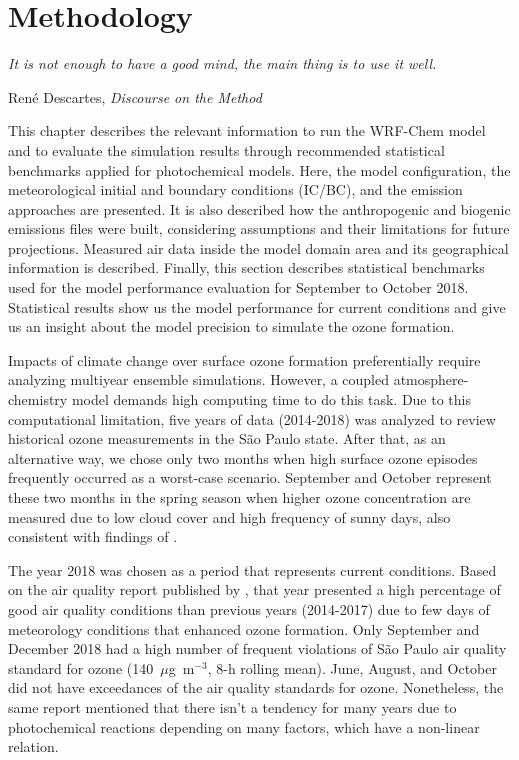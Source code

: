 \chapter{\bf Methodology}\label{chap:metho}
\epigraph{\textit{It is not enough to have a good mind, the main thing is to use it well.}}{René Descartes, \textit{Discourse on the Method}}

\noindent This chapter describes the relevant information to run the WRF-Chem model and to evaluate the simulation results through recommended statistical benchmarks applied for photochemical models. 
Here, the model configuration, the meteorological initial and boundary conditions (IC/BC), and the emission approaches are presented.
It is also described how the anthropogenic and biogenic emissions files were built, considering assumptions and their limitations for future projections.
Measured air data inside the model domain area and its geographical information is described.
Finally, this section describes statistical benchmarks used for the model performance evaluation for September to October 2018.
Statistical results show us the model performance for current conditions and give us an insight about the model precision to simulate the ozone formation.

Impacts of climate change over surface ozone formation preferentially require analyzing multiyear ensemble simulations.
However, a coupled atmosphere-chemistry model demands high computing time to do this task.
Due to this computational limitation, five years of data (2014-2018) was analyzed to review historical ozone measurements in the S\~{a}o Paulo state. 
After that, as an alternative way, we chose only two months when high surface ozone episodes frequently occurred as a worst-case scenario.
September and October represent these two months in the spring season when higher ozone concentration are measured due to low cloud cover and high frequency of sunny days, also consistent with findings of \citet{Carvalho2015}.

The year 2018 was chosen as a period that represents current conditions.
Based on the air quality report published by \citet{CETESB2019}, that year presented a high percentage of good air quality conditions than previous years (2014-2017) due to few days of meteorology conditions that enhanced ozone formation.
Only September and December 2018 had a high number of frequent violations of S\~{a}o Paulo air quality standard for ozone (140~$\mu$g~m$^{-3}$, 8-h rolling mean).
June, August, and October did not have exceedances of the air quality standards for ozone.
Nonetheless, the same report mentioned that there isn't a tendency for many years due to photochemical reactions depending on many factors, which have a non-linear relation.

